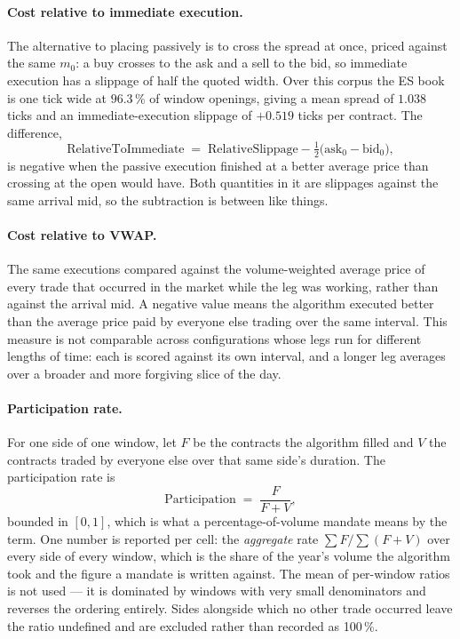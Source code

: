 \documentclass[11pt]{article}
\begin{document}
\paragraph{Cost relative to immediate execution.} The alternative to placing
passively is to cross the spread at once, priced against the same $m_{0}$: a buy
crosses to the ask and a sell to the bid, so immediate execution has a slippage
of half the quoted width. Over this corpus the ES book is one tick wide at
$96.3\,\%$ of window openings, giving a mean spread of $1.038$ ticks and an
immediate-execution slippage of $+0.519$ ticks per contract. The difference,
\begin{equation}
  \text{RelativeToImmediate} \;=\; \text{RelativeSlippage} - \tfrac12\big(
        \text{ask}_{0} - \text{bid}_{0}\big),
  \label{eq:vstouch}
\end{equation}
is negative when the passive execution finished at a better average price than
crossing at the open would have. Both quantities in it are slippages against the
same arrival mid, so the subtraction is between like things.

\paragraph{Cost relative to VWAP.} The same executions compared against the
volume-weighted average price of every trade that occurred in the market while
the leg was working, rather than against the arrival mid. A negative value
means the algorithm executed better than the average price paid by everyone else
trading over the same interval. This measure is not comparable across
configurations whose legs run for different lengths of time: each is scored
against its own interval, and a longer leg averages over a broader and more
forgiving slice of the day.

\paragraph{Participation rate.} For one side of one window, let $F$ be the
contracts the algorithm filled and $V$ the contracts traded by everyone else
over that same side's duration. The participation rate is
\begin{equation}
  \text{Participation} \;=\; \frac{F}{F+V},
  \label{eq:part}
\end{equation}
bounded in $[0,1]$, which is what a percentage-of-volume mandate means by the
term. One number is reported per cell: the \emph{aggregate} rate
$\sum F / \sum (F+V)$ over every side of every window, which is the share of the
year's volume the algorithm took and the figure a mandate is written against.
The mean of per-window ratios is not used --- it is dominated by windows with
very small denominators and reverses the ordering entirely. Sides alongside
which no other trade occurred leave the ratio undefined and are excluded rather
than recorded as 100\,\%.
\end{document}
